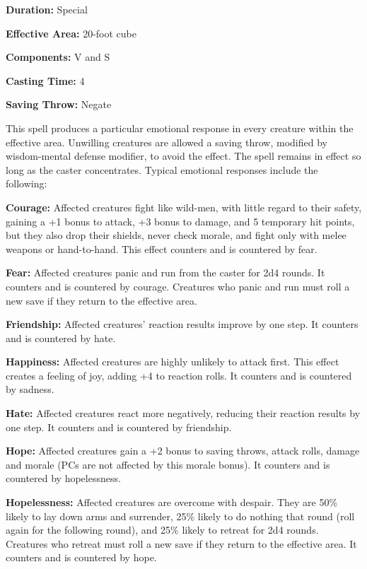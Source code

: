 \begin{multicols}{2}
\begin{minipage}{\columnwidth}
\noindent \textbf{Duration:} Special

\noindent \textbf{Effective Area:} 20-foot cube

\noindent \textbf{Components:} V and S

\noindent \textbf{Casting Time:} 4

\noindent \textbf{Saving Throw:} Negate

\end{minipage}

This spell produces a particular emotional response in every creature within the effective area.  Unwilling creatures are allowed a saving throw, modified by wisdom-mental defense modifier, to avoid the effect.  The spell remains in effect so long as the caster concentrates.  Typical emotional responses include the following:

\textbf{Courage:} Affected creatures fight like wild-men, with little regard to their safety, gaining a +1 bonus to attack, +3 bonus to damage, and 5 temporary hit points, but they also drop their shields, never check morale, and fight only with melee weapons or hand-to-hand.  This effect counters and is countered by fear.

\textbf{Fear:} Affected creatures panic and run from the caster for 2d4 rounds.  It counters and is countered by courage.  Creatures who panic and run must roll a new save if they return to the effective area.

\textbf{Friendship:} Affected creatures' reaction results improve by one step.  It counters and is countered by hate.

\textbf{Happiness:} Affected creatures are highly unlikely to attack first.  This effect creates a feeling of joy, adding +4 to reaction rolls.  It counters and is countered by sadness.

\textbf{Hate:} Affected creatures react more negatively, reducing their reaction results by one step.  It counters and is countered by friendship.

\textbf{Hope:} Affected creatures gain a +2 bonus to saving throws, attack rolls, damage and morale (PCs are not affected by this morale bonus).  It counters and is countered by hopelessness.

\textbf{Hopelessness:} Affected creatures are overcome with despair.  They are 50\% likely to lay down arms and surrender, 25\% likely to do nothing that round (roll again for the following round), and 25\% likely to retreat for 2d4 rounds.  Creatures who retreat must roll a new save if they return to the effective area.  It counters and is countered by hope.


\end{multicols}
